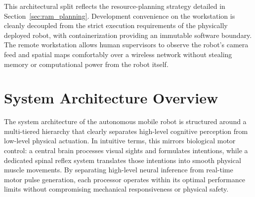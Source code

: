 This architectural split reflects the resource-planning strategy detailed in Section~\ref{sec:ram_planning}. Development convenience on the workstation is cleanly decoupled from the strict execution requirements of the physically deployed robot, with containerization providing an immutable software boundary. The remote workstation allows human supervisors to observe the robot's camera feed and spatial maps comfortably over a wireless network without stealing memory or computational power from the robot itself.

\section{System Architecture Overview}
The system architecture of the autonomous mobile robot is structured around a multi-tiered hierarchy that clearly separates high-level cognitive perception from low-level physical actuation. In intuitive terms, this mirrors biological motor control: a central brain processes visual sights and formulates intentions, while a dedicated spinal reflex system translates those intentions into smooth physical muscle movements. By separating high-level neural inference from real-time motor pulse generation, each processor operates within its optimal performance limits without compromising mechanical responsiveness or physical safety.

